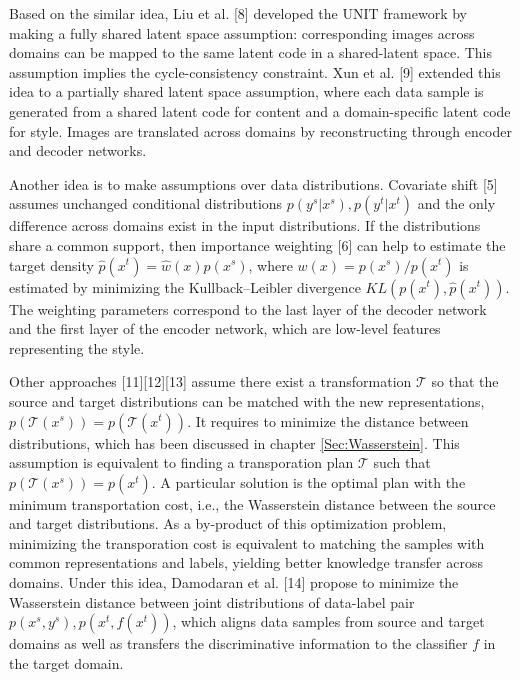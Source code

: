 \documentclass{article}
\begin{document}
Based on the similar idea, Liu et al. [8] developed the UNIT framework by making a fully shared latent space assumption: corresponding images across domains can be mapped to the same latent code in a shared-latent space. This assumption implies the cycle-consistency constraint. Xun et al. [9] extended this idea to a partially shared latent space assumption, where each data sample is generated from a shared latent code for content and a domain-specific latent code for style. Images are translated across domains by reconstructing through encoder and decoder networks.

Another idea is to make assumptions over data distributions. Covariate shift [5] assumes unchanged conditional distributions $p(y^s|x^s), p(y^t|x^t)$ and the only difference across domains exist in the input distributions. If the distributions share a common support, then importance weighting [6] can help to estimate the target density $\hat{p}(x^t) = \hat{w}(x)p(x^s)$, where $w(x) = p(x^s)/p(x^t)$ is estimated by minimizing the Kullback–Leibler divergence $KL(p(x^t),\hat{p}(x^t))$. The weighting parameters correspond to the last layer of the decoder network and the first layer of the encoder network, which are low-level features representing the style.

Other approaches [11][12][13] assume there exist a transformation $\mathcal{T}$ so that the source and target distributions can be matched with the new representations, $p(\mathcal{T}(x^s)) = p(\mathcal{T}(x^t))$. It requires to minimize the distance between distributions, which has been discussed in chapter \ref{Sec:Wasserstein}. This assumption is equivalent to finding a transporation plan $\mathcal{T}$ such that $p(\mathcal{T}(x^s)) = p(x^t)$. A particular solution is the optimal plan with the minimum transportation cost, i.e., the Wasserstein distance between the source and target distributions. As a by-product of this optimization problem, minimizing the transporation cost is equivalent to matching the samples with common representations and labels, yielding better knowledge transfer across domains. Under this idea, Damodaran et al. [14] propose to minimize the Wasserstein distance between joint distributions of data-label pair $p(x^s, y^s), p(x^t, f(x^t))$, which aligns data samples from source and target domains as well as transfers the discriminative information to the classifier $f$ in the target domain.

\end{document}

